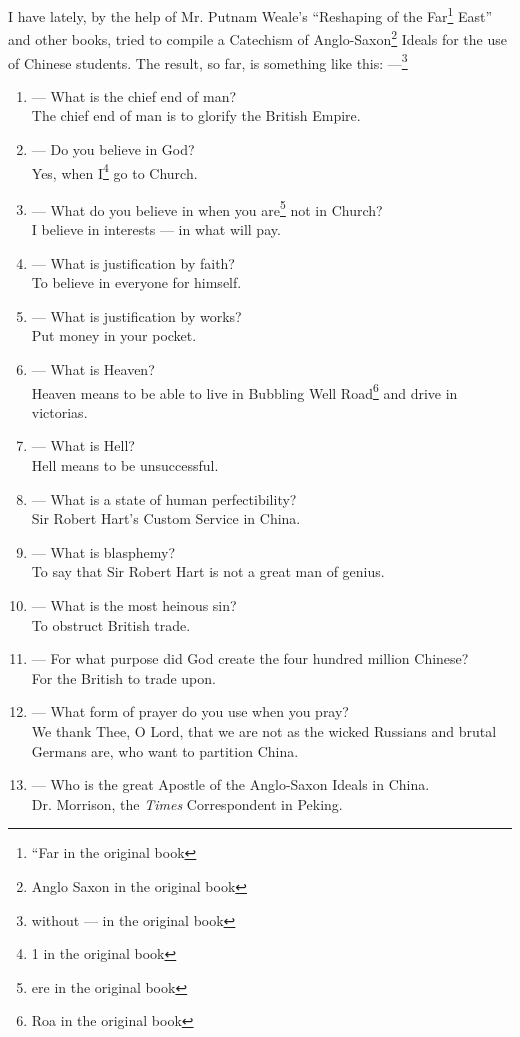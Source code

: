I have lately, by the help of Mr. Putnam Weale's ``Reshaping of the Far\footnote{``Far in the original book} East'' and other books, tried to compile a Catechism of Anglo-Saxon\footnote{Anglo Saxon in the original book} Ideals for the use of Chinese students.
The result, so far, is something like this: ---\footnote{without --- in the original book}
\begin{enumerate}
    \item --- What is the chief end of man? \\ The chief end of man is to glorify the British Empire.
    \item --- Do you believe in God? \\ Yes, when I\footnote{1 in the original book} go to Church.
    \item --- What do you believe in when you are\footnote{ere in the original book} not in Church? \\ I believe in interests --- in what will pay.
    \item --- What is justification by faith? \\ To believe in everyone for himself.
    \item --- What is justification by works? \\ Put money in your pocket.
    \item --- What is Heaven? \\ Heaven means to be able to live in Bubbling Well Road\footnote{Roa in the original book} and drive in victorias.
    \item --- What is Hell? \\ Hell means to be unsuccessful.
    \item --- What is a state of human perfectibility? \\ Sir Robert Hart's Custom Service in China.
    \item --- What is blasphemy? \\ To say that Sir Robert Hart is not a great man of genius.
    \item --- What is the most heinous sin? \\ To obstruct British trade.
    \item --- For what purpose did God create the four hundred million Chinese? \\ For the British to trade upon.
    \item --- What form of prayer do you use when you pray? \\ We thank Thee, O Lord, that we are not as the wicked Russians and brutal Germans are, who want to partition China.
    \item --- Who is the great Apostle of the Anglo-Saxon Ideals in China. \\ Dr. Morrison, the \emph{Times} Correspondent in Peking.
\end{enumerate}

